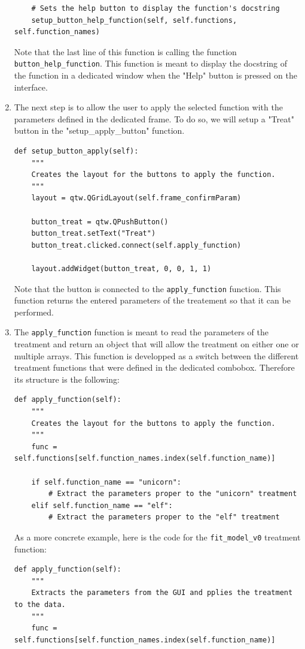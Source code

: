 \documentclass{book}
\begin{document}
\begin{enumerate}
\begin{lstlisting}
    # Sets the help button to display the function's docstring
    setup_button_help_function(self, self.functions, self.function_names)
\end{lstlisting}
        Note that the last line of this function is calling the function \texttt{button\_help\_function}. This function is meant to display the docstring of the function in a dedicated window when the "Help" button is pressed on the interface.
        \item The next step is to allow the user to apply the selected function with the parameters defined in the dedicated frame. To do so, we will setup a "Treat" button in the "setup\_apply\_button" function. 
\begin{lstlisting}
def setup_button_apply(self):
    """
    Creates the layout for the buttons to apply the function.
    """
    layout = qtw.QGridLayout(self.frame_confirmParam)

    button_treat = qtw.QPushButton()
    button_treat.setText("Treat")
    button_treat.clicked.connect(self.apply_function)

    layout.addWidget(button_treat, 0, 0, 1, 1)
\end{lstlisting}
        Note that the button is connected to the \texttt{apply\_function} function. This function returns the entered parameters of the treatement so that it can be performed.
        \item The \texttt{apply\_function} function is meant to read the parameters of the treatment and return an object that will allow the treatment on either one or multiple arrays. This function is developped as a switch between the different treatment functions that were defined in the dedicated combobox. Therefore its structure is the following:
\begin{lstlisting}
def apply_function(self):
    """
    Creates the layout for the buttons to apply the function.
    """
    func = self.functions[self.function_names.index(self.function_name)]

    if self.function_name == "unicorn":
        # Extract the parameters proper to the "unicorn" treatment
    elif self.function_name == "elf":
        # Extract the parameters proper to the "elf" treatment
\end{lstlisting}
        As a more concrete example, here is the code for the \texttt{fit\_model\_v0} treatment function:
\begin{lstlisting}
def apply_function(self):
    """
    Extracts the parameters from the GUI and pplies the treatment to the data.
    """
    func = self.functions[self.function_names.index(self.function_name)]


\end{lstlisting}
\end{enumerate}
\end{document}
